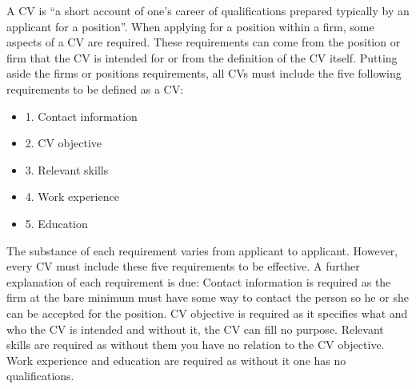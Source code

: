A CV is “a short account of one’s career of qualifications prepared typically by an applicant for a position”.\cite{Difference_between_resume_and_curriculum_Vitae}
When applying for a position within a firm, some aspects of a CV are required.
These requirements can come from the position or firm that the CV is intended for or from the definition of the CV itself.
Putting aside the firms or positions requirements, all CVs must include the five following requirements to be defined as a CV:
\begin{itemize}
   \item 1. Contact information
   \item 2. CV objective
   \item 3. Relevant skills
   \item 4. Work experience
   \item 5. Education\cite{Write_a_curriculum_Vitae} \\
\end{itemize}
The substance of each requirement varies from applicant to applicant. However, every CV must include these five requirements to be effective.
A further explanation of each requirement is due:
Contact information is required as the firm at the bare minimum must have some way to contact the person so he or she can be accepted for the position.
CV objective is required as it specifies what and who the CV is intended and without it, the CV can fill no purpose.
Relevant skills are required as without them you have no relation to the CV objective.
Work experience and education are required as without it one has no qualifications. \\

